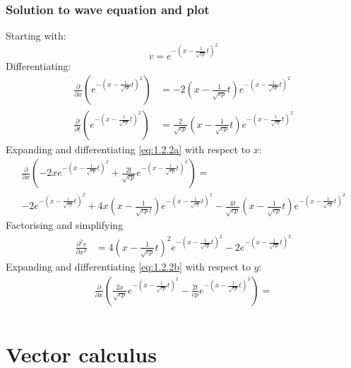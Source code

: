 \documentclass[11pt]{article}
\numberwithin{equation}{section}
\begin{document}
\subsubsection{Solution to wave equation and plot}
Starting with:
\begin{equation}
    v=e^{-\left(x- \frac{1}{\sqrt{cp}}t\right)^2}
\end{equation}
Differentiating:
\begin{align}
    \frac{\partial}{\partial x} \left(e^{-\left(x- \frac{1}{\sqrt{cp}}t\right)^2}\right) &= -2 \left(x - \frac{1}{\sqrt{cp}}t\right)e^{-\left(x- \frac{1}{\sqrt{cp}}t\right)^2} \label{eq:1.2.2a}\\
    \frac{\partial}{\partial t} \left(e^{-\left(x- \frac{1}{\sqrt{cp}}t\right)^2}\right) &= \frac{2}{\sqrt{cp}}\left(x - \frac{1}{\sqrt{cp}}t\right)e^{-\left(x- \frac{1}{\sqrt{cp}}t\right)^2}\label{eq:1.2.2b}
\end{align}
Expanding and differentiating \ref{eq:1.2.2a} with respect to $x$:
\begin{multline}
    \frac{\partial}{\partial x} \left(-2xe^{-\left(x- \frac{1}{\sqrt{cp}}t\right)^2} + \frac{2t}{\sqrt{cp}}e^{-\left(x- \frac{1}{\sqrt{cp}}t\right)^2}\right) = \\
    -2e^{-\left(x- \frac{1}{\sqrt{cp}}t\right)^2} + 4x\left(x- \frac{1}{\sqrt{cp}t}\right)e^{-\left(x- \frac{1}{\sqrt{cp}}t\right)^2} - \frac{4t}{\sqrt{cp}}\left(x - \frac{1}{\sqrt{cp}}t\right)e^{-\left(x- \frac{1}{\sqrt{cp}}t\right)^2}
\end{multline}
Factorising and simplifying
\begin{align}
    \frac{\partial^2 v}{\partial x^2} &= 4\left(x - \frac{1}{\sqrt{cp}}t\right)^2 e^{-\left(x- \frac{1}{\sqrt{cp}}t\right)^2} -2e^{-\left(x- \frac{1}{\sqrt{cp}}t\right)^2}
\end{align}
Expanding and differentiating \ref{eq:1.2.2b} with respect to $y$:
\begin{multline}
    \frac{\partial}{\partial x} \left(\frac{2x}{\sqrt{cp}}e^{-\left(x- \frac{1}{\sqrt{cp}}t\right)^2} - \frac{2t}{cp}e^{-\left(x- \frac{1}{\sqrt{cp}}t\right)^2}\right) = \\
\end{multline}
\section{Vector calculus}
\end{document}
